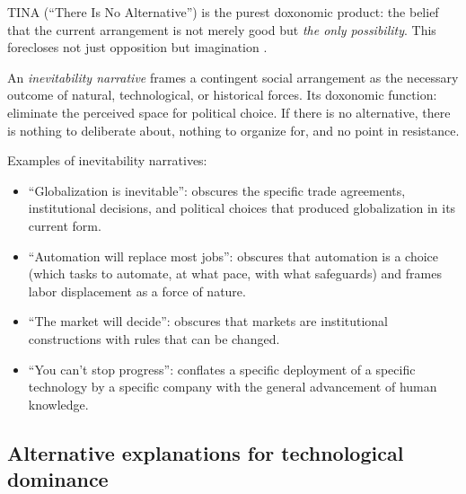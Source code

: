 TINA (``There Is No Alternative'') is the purest doxonomic product: the belief that the current arrangement is not merely good but \emph{the only possibility}.
This forecloses not just opposition but imagination \autocite{brown2015, streeck2016}.

\begin{definition}
\label{def:inevitability}
An \emph{inevitability narrative} frames a contingent social arrangement as the necessary outcome of natural, technological, or historical forces.
Its doxonomic function: eliminate the perceived space for political choice.
If there is no alternative, there is nothing to deliberate about, nothing to organize for, and no point in resistance.
\end{definition}

Examples of inevitability narratives:
\begin{itemize}[nosep]
  \item ``Globalization is inevitable'': obscures the specific trade agreements, institutional decisions, and political choices that produced globalization in its current form.
  \item ``Automation will replace most jobs'': obscures that automation is a choice (which tasks to automate, at what pace, with what safeguards) and frames labor displacement as a force of nature.
  \item ``The market will decide'': obscures that markets are institutional constructions with rules that can be changed.
  \item ``You can't stop progress'': conflates a specific deployment of a specific technology by a specific company with the general advancement of human knowledge.
\end{itemize}

\subsection{Alternative explanations for technological dominance}

